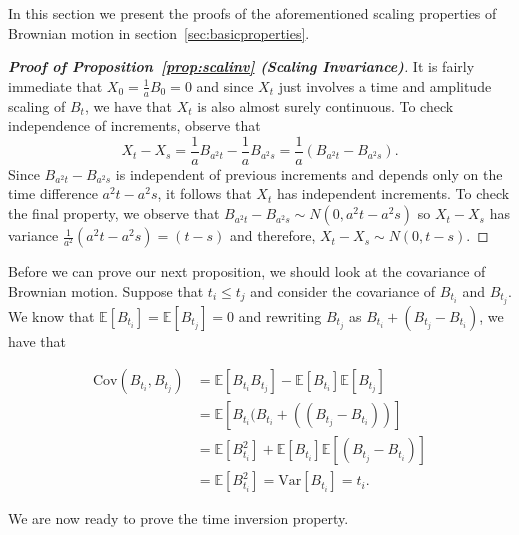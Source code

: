 \documentclass[a4paper,11pt]{article}
\theoremstyle{plain}
\theoremstyle{definition}
\begin{document}
In this section we present the proofs of the aforementioned scaling properties of Brownian motion in section~\ref{sec:basicproperties}.

\begin{proof}[\textbf{Proof of Proposition~\ref{prop:scalinv} (Scaling Invariance)}]
\citep[p.~12]{M&P} It is fairly immediate that $X_0 = \frac{1}{a} B_0 = 0$ and since $X_t$ just involves a time and amplitude scaling of $B_t$, we have that $X_t$ is also almost surely continuous. To check independence of increments, observe that
\[
X_t - X_s = \frac{1}{a} B_{a^2t} - \frac{1}{a} B_{a^2s} = \frac{1}{a} (B_{a^2t} - B_{a^2s}).
\]
Since $B_{a^2t} - B_{a^2s}$ is independent of previous increments and depends only on the time difference $a^2t - a^2s$, it follows that $X_{t}$ has independent increments. To check the final property, we observe that $B_{a^2t} - B_{a^2s} \sim N(0, a^2t - a^2s)$ so $X_{t} - X_{s}$ has variance $\frac{1}{a^2} (a^2t - a^2s) = (t - s)$ and therefore, $X_{t} - X_{s} \sim N(0, t - s)$.
\end{proof}

Before we can prove our next proposition, we should look at the covariance of Brownian motion. Suppose that $t_i \leq t_j$ and consider the covariance of $B_{t_i}$ and $B_{t_j}$. We know that $\mathbb{E}[B_{t_i}] = \mathbb{E}[B_{t_j}] = 0$ and rewriting $B_{t_j}$ as $B_{t_i} + (B_{t_j} - B_{t_i})$, we have that

\[
  \begin{aligned}
    \mathrm{Cov}(B_{t_i},B_{t_j}) & = \mathbb{E}[B_{t_i}B_{t_j}] - \mathbb{E}[B_{t_i}]\mathbb{E}[B_{t_j}]\\
      & = \mathbb{E}[B_{t_i}(B_{t_i} + ((B_{t_j} - B_{t_i}))]\\
      & = \mathbb{E}[B_{t_i}^2] + \mathbb{E}[B_{t_i}]\mathbb{E}[(B_{t_j} - B_{t_i})]\\
      & = \mathbb{E}[B_{t_i}^2] = \mathrm{Var}[B_{t_i}] = t_i.
  \end{aligned}
\]

We are now ready to prove the time inversion property.
\end{document}
